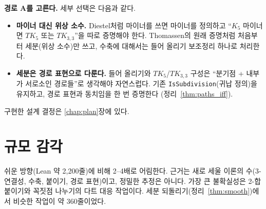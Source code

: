 \textbf{경로 A를 고른다.} 세부 선택은 다음과 같다.
\begin{itemize}
  \item \textbf{마이너 대신 위상 소수.} Diestel처럼 마이너를 쓰면 마이너를 정의하고 ``\(K_5\) 마이너면
        \(TK_5\) 또는 \(TK_{3,3}\)''을 따로 증명해야 한다. Thomassen의 원래 증명처럼 처음부터 세분(위상
        소수)만 쓰고, 수축에 대해서는 들어 올리기 보조정리 하나로 처리한다.
  \item \textbf{세분은 경로 표현으로 다룬다.} 들어 올리기와 \(TK_5\)/\(TK_{3,3}\) 구성은 ``분기점 +
        내부가 서로소인 경로들''로 생각해야 자연스럽다. 기존 \texttt{IsSubdivision}(귀납 정의)을 유지하고,
        경로 표현과 동치임을 한 번 증명한다 (정리~\ref{thm:paths_iff}).
\end{itemize}
구현한 설계 결정은 \ref{chap:plan}장에 있다.

\section{규모 감각}

쉬운 방향(Lean 약 2,200줄)에 비해 2--4배로 어림한다. 근거는 새로 세울 이론의 수(3-연결성, 수축, 붙이기,
경로 표현)이고, 정밀한 추정은 아니다. 가장 큰 불확실성은 2-합 붙이기와 꼭짓점 나누기의 다트 대응
작업이다. 세분 되돌리기(정리~\ref{thm:smooth})에서 비슷한 작업이 약 360줄이었다.
